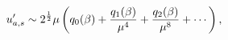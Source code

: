 \[u^{\prime}_{a,s}\sim 2^{\frac{1}{2}}\mu\left(q_{0}(\beta)+\frac{q_{1}(\beta)}{%
\mu^{4}}+\frac{q_{2}(\beta)}{\mu^{8}}+\cdots\right),\]